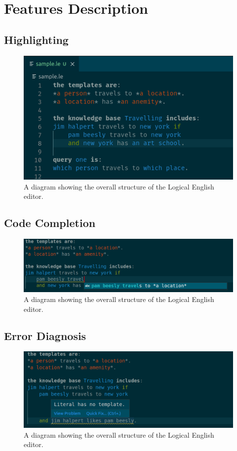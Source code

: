 \documentclass[../main.tex]{subfiles}
\begin{document}
\section{Features Description}
\subsection{Highlighting}
\begin{figure}[h!]
\centering
\includegraphics[width = \linewidth]{./figures/highlighting.png}
\caption{A diagram showing the overall structure of the Logical English editor.}
\label{fig:system-overview}
\end{figure}

\subsection{Code Completion}\begin{figure}[h!]
\centering
\includegraphics[width = \linewidth]{./figures/auto-suggest.png}
\caption{A diagram showing the overall structure of the Logical English editor.}
\label{fig:system-overview}
\end{figure}

\subsection{Error Diagnosis}
\begin{figure}[h!]
\centering
\includegraphics[width = \linewidth]{./figures/literal-wo-template.png}
\caption{A diagram showing the overall structure of the Logical English editor.}
\label{fig:system-overview}
\end{figure}
\end{document}
